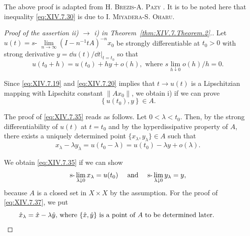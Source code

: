 \begin{remarku} The above proof is adapted from H. \textsc{Brezis}-A. \textsc{Pazy} \cite{brezis29}. It is to be noted here that inequality \eqref{eq:XIV.7.30} is due to I. \textsc{Miyadera}-S. \textsc{Oharu}\cite{miyadera204}. 
\end{remarku}

\begin{proof}[Proof of the assertion ii) $\rightarrow$ i) in Theorem~\ref{thm:XIV.7.Theorem.2}.]
Let $u(t) = s\text{- }\lim\limits_{n\to \infty}(I - n^{-1}tA)^{-n}x_0$ be strongly differentiable at $t_0 > 0$ with strong derivative $y = \dd u(t) / \dd t|_{t=t_0}$ so that
\begin{equation}\label{eq:XIV.7.34}
u \left(t _{0} + h\right) = u \left(t _{0}\right) + h y + o (h), \text{ where } s \underset {h \downarrow 0} {\lim} o (h) / h = 0.
\end{equation}

Since \eqref{eq:XIV.7.19} and \eqref{eq:XIV.7.20} implies that $t \to u(t)$ is a Lipschitzian mapping with Lipschitz constant $\|Ax_0\|$, we obtain i) if we can prove 
\begin{equation}\label{eq:XIV.7.35}
\left\{u \left(t _{0}\right), y \right\} \in A.
\end{equation}

The proof of \eqref{eq:XIV.7.35} reads as follows. Let $0 < \lambda < t_{0}$. Then, by the strong differentiability of $u(t)$ at $t = t_{0}$ and by the hyperdissipative property of $A$, there exists a uniquely determined point $\{x_{\lambda}, y_{\lambda}\} \in A$ such that 
\begin{equation}\label{eq:XIV.7.36}
x _{\lambda} - \lambda y _{\lambda} = u (t _{0} - \lambda) = u (t _{0}) - \lambda y + o (\lambda).
\end{equation}

We obtain \eqref{eq:XIV.7.35} if we can show 
\begin{equation}\label{eq:XIV.7.37}
\text{s-}\lim _{\lambda \downarrow 0} x _{\lambda} = u (t _{0}) \quad \text{ and } \quad \text{s-}\lim _{\lambda \downarrow 0} y _{\lambda} = y,
\end{equation}
because $A$ is a closed set in $X \times X$ by the assumption. For the proof of \eqref{eq:XIV.7.37}, we put 
\begin{equation}\label{eq:XIV.7.38}
\parbox{0.92\linewidth}{\everymath{}\let\limits\nolimits $\hat{x}_{\lambda} = \hat{x} - \lambda \hat{y}$, where $\{\hat{x}, \hat{y}\}$ is a point of $A$ to be determined later.}
\end{equation} 



\end{proof}
